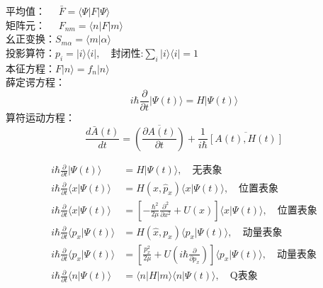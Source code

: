 \begin{frame} 
    平均值：  $\hspace{1em}\bar{F} = \langle \Psi |F | \Psi \rangle$ \\ \vspace{0.2em}
    矩阵元：  $\hspace{1em}F_{nm} = \langle n |F | m \rangle$ \\ \vspace{0.2em}
    幺正变换：$S_{m\alpha} =\langle m| \alpha \rangle $ \\ \vspace{0.2em}
    投影算符：$p_i = |i\rangle\langle i |, \quad \text{封闭性:} \sum_i |i\rangle\langle i |=1 $ \\ \vspace{0.2em}
    本征方程：$F|n\rangle =f_n |n\rangle$ \\ \vspace{0.2em}
    薛定谔方程：$$ i\hbar \frac{\partial }{\partial t} |\Psi(t)\rangle = H|\Psi(t)\rangle $$ 
    算符运动方程：$$ \frac{d\bar{A}(t)}{dt}=\overline{(\frac{\partial A(t) }{\partial t})}  +\frac{1}{i\hbar} \overline{[A(t),H(t)]}$$
\end{frame} 

\begin{frame} 
    \例 [5、求薛定谔方程在各表象中的形式]{} 
    $$ \begin{aligned}
    i \hbar \frac{\partial}{\partial t} |\Psi(t) \rangle &= H |\Psi(t) \rangle  , \quad \text{无表象}\\
    i \hbar \frac{\partial}{\partial t} \langle x|\Psi(t) \rangle &= H (x, \hat{p}_x) \langle x|\Psi(t) \rangle  , \quad \text{位置表象}\\
    i \hbar \frac{\partial}{\partial t} \langle x|\Psi(t) \rangle &= [- \frac{\hbar^2}{2\mu} \frac{\partial ^2 }{\partial x^2} + U(x)] \langle x|\Psi(t) \rangle  , \quad \text{位置表象}\\
    i \hbar \frac{\partial}{\partial t} \langle p_x|\Psi(t) \rangle &= H (\hat{x}, p_x) \langle p_x|\Psi(t) \rangle  , \quad \text{动量表象}\\
    i \hbar \frac{\partial}{\partial t} \langle p_x|\Psi(t) \rangle &=  [ \frac{p^2 _x}{2\mu} + U(i \hbar \frac{\partial }{\partial p_x}) ] \langle p_x|\Psi(t) \rangle  , \quad \text{动量表象}\\
    i \hbar \frac{\partial}{\partial t} \langle n|\Psi(t) \rangle &=  \langle n|H|m \rangle \langle n |\Psi(t) \rangle  , \quad \text{Q表象}\\
    \end{aligned}
    $$
\end{frame} 

